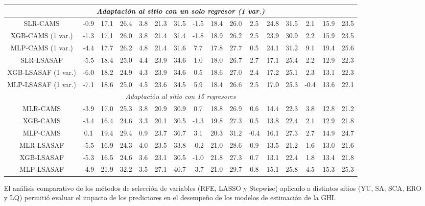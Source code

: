 \begin{table}[ht!]
{\begin{tabular}{cccccccccccccccc}
\multicolumn{16}{|c|}{\textit{Adaptación al sitio con un solo regresor (1 var.)}} \\
\hline
SLR-CAMS    & -0.9 & 17.1 & 26.4 &  3.8 & 21.3 & 31.5 & -1.5 & 18.4 & 26.0 &  2.5 & 24.8 & 31.5 &  2.1 & 15.9 & 23.5 \\
XGB-CAMS (1 var.) & -1.3 & 17.1 & 26.0 &  3.8 & 21.4 & 31.4 & -1.8 & 18.9 & 26.2 &  2.5 & 23.9 & 30.9 &  2.2 & 15.9 & 23.5 \\
MLP-CAMS (1 var.) & -4.4 & 17.7 & 26.2 &  4.8 & 21.4 & 31.6 &  7.7 & 17.8 & 27.7 &  0.5 & 24.1 & 31.2 &  9.1 & 19.4 & 25.6 \\
SLR-LSASAF  & -5.5 & 18.4 & 25.0 &  4.4 & 23.9 & 34.6 &  1.0 & 18.0 & 26.7 &  2.7 & 17.1 & 25.4 &  2.2 & 12.9 & 22.3 \\
XGB-LSASAF (1 var.) & -6.0 & 18.2 & 24.9 &  4.3 & 23.9 & 34.6 &  0.5 & 18.6 & 27.0 &  2.4 & 17.2 & 25.1 &  2.3 & 13.1 & 22.3 \\
MLP-LSASAF (1 var.) & -7.1 & 18.6 & 25.0 &  4.5 & 23.6 & 34.5 &  5.9 & 18.4 & 26.6 &  2.5 & 17.0 & 25.3 & -0.4 & 13.6 & 22.1 \\
\hline
\multicolumn{16}{|c|}{\textit{Adaptación al sitio con 15 regresores}} \\
\hline
MLR-CAMS    & -3.9 & 17.0 & 25.3 &  3.8 & 20.9 & 30.9 &  0.7 & 18.8 & 26.9 &  0.6 & 14.4 & 22.3 &  3.8 & 12.8 & 21.2 \\
XGB-CAMS    & -3.4 & 16.4 & 24.6 &  3.3 & 20.1 & 30.5 & -1.3 & 19.8 & 27.3 &  0.5 & 13.8 & 22.4 &  2.1 & 12.9 & 21.8 \\
MLP-CAMS    &  0.1 & 19.4 & 29.4 &  0.9 & 23.7 & 36.7 &  3.1 & 20.3 & 31.2 & -0.4 & 16.1 & 27.3 &  2.7 & 14.9 & 24.7 \\
MLR-LSASAF  & -5.5 & 16.9 & 24.3 &  4.0 & 23.5 & 33.8 & -0.2 & 21.0 & 28.6 &  0.9 & 13.5 & 21.2 &  1.6 & 13.0 & 21.6 \\
XGB-LSASAF  & -5.3 & 16.5 & 24.6 &  3.6 & 23.1 & 30.5 & -1.0 & 21.8 & 27.3 &  0.7 & 13.1 & 22.4 &  1.8 & 13.4 & 21.8 \\
MLP-LSASAF  & -4.9 & 21.9 & 32.2 &  3.5 & 27.1 & 40.7 & -3.7 & 21.0 & 29.7 &  0.8 & 15.1 & 25.8 &  4.5 & 15.3 & 25.3 \\
\hline
\end{tabular}}
\end{table}





El análisis comparativo de los métodos de selección de variables (RFE, LASSO y Stepwise) aplicado a distintos sitios (YU, SA, SCA, ERO y LQ) permitió evaluar el impacto de los predictores en el desempeño de los modelos de estimación de la GHI.\\

